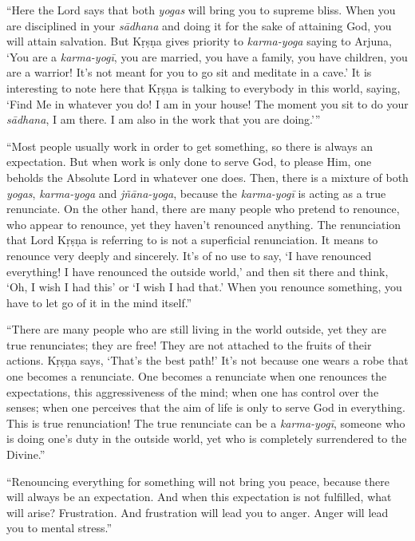 \enquote{Here the Lord says that both \textit{yogas} will bring you to supreme bliss. When you are disciplined in your \textit{sādhana} and doing it for the sake of attaining God, you will attain salvation. But Kṛṣṇa gives priority to \textit{karma-yoga} saying to Arjuna, \enquote{You are a \textit{karma-yogī}, you are married, you have a family, you have children, you are a warrior! It’s not meant for you to go sit and meditate in a cave.} It is interesting to note here that Kṛṣṇa is talking to everybody in this world, saying, \enquote{Find Me in whatever you do! I am in your house! The moment you sit to do your \textit{sādhana}, I am there. I am also in the work that you are doing.}}

\enquote{Most people usually work in order to get something, so there is always an expectation. But when work is only done to serve God, to please Him, one beholds the Absolute Lord in whatever one does. Then, there is a mixture of both \textit{yogas}, \textit{karma-yoga} and \textit{jñāna-yoga}, because the \textit{karma-yogī} is acting as a true renunciate. On the other hand, there are many people who pretend to renounce, who appear to renounce, yet they haven’t renounced anything. The renunciation that Lord Kṛṣṇa is referring to is not a superficial renunciation. It means to renounce very deeply and sincerely. It’s of no use to say, \enquote{I have renounced everything! I have renounced the outside world,} and then sit there and think, \enquote{Oh, I wish I had this} or \enquote{I wish I had that.} When you renounce something, you have to let go of it in the mind itself.}

\enquote{There are many people who are still living in the world outside, yet they are true renunciates; they are free! They are not attached to the fruits of their actions. Kṛṣṇa says, \enquote{That’s the best path!} It’s not because one wears a robe that one becomes a renunciate. One becomes a renunciate when one renounces the expectations, this aggressiveness of the mind; when one has control over the senses; when one perceives that the aim of life is only to serve God in everything. This is true renunciation! The true renunciate can be a \textit{karma-yogī}, someone who is doing one’s duty in the outside world, yet who is completely surrendered to the Divine.}

\enquote{Renouncing everything for something will not bring you peace, because there will always be an expectation. And when this expectation is not fulfilled, what will arise? Frustration. And frustration will lead you to anger. Anger will lead you to mental stress.}

